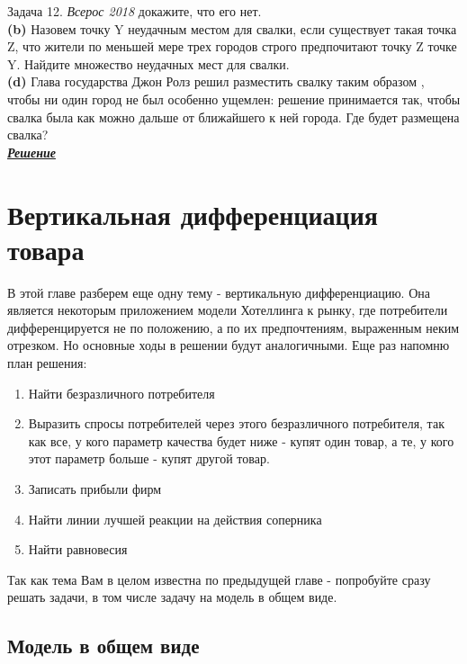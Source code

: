 \begin{mybox}{Задача 12. \textit{Всерос 2018}}
    докажите, что его нет.\smallskip\\
    \indent\setlength{\parindent}{1em}\textbf{(b)} Назовем точку Y неудачным местом для свалки, если существует такая
    точка Z, что жители по меньшей мере трех городов строго предпочитают точку Z точке Y. Найдите множество неудачных
    мест для свалки.\smallskip\\
    \indent\setlength{\parindent}{1em}\textbf{(d)} Глава государства Джон Ролз решил разместить свалку таким образом
    , чтобы ни один город не был особенно ущемлен: решение принимается так, чтобы свалка была как можно дальше от
    ближайшего к ней города. Где будет размещена свалка?\bigskip\\
    \textit{\textbf{\centering\href{https://iloveeconomics.ru/sites/default/files/olimp/vseros/2018/vseros_2018_vseros_10-11_klass_1_tur_resheniya_18405.pdf}{Решение}}}
\end{mybox}



\chapter{Вертикальная дифференциация товара}

\indent\setlength{\parindent}{1em}\indent\setlength{\parindent}{1em}В этой главе разберем еще одну тему - вертикальную
дифференциацию. Она является некоторым приложением модели Хотеллинга к рынку, где потребители дифференцируется не по
положению, а по их предпочтениям, выраженным неким отрезком. Но основные ходы в решении будут аналогичными. Еще раз
напомню план решения:
\begin{enumerate}
    \item Найти безразличного потребителя
    \item Выразить спросы потребителей через этого безразличного потребителя, так как все, у кого параметр качества
    будет ниже - купят один товар, а те, у кого этот параметр больше - купят другой товар.
    \item Записать прибыли фирм
    \item Найти линии лучшей реакции на действия соперника
    \item Найти равновесия
\end{enumerate}
\indent\setlength{\parindent}{1em}Так как тема Вам в целом известна по предыдущей главе - попробуйте сразу решать
задачи, в том числе задачу на модель в общем виде.


\section{Модель в общем виде}

